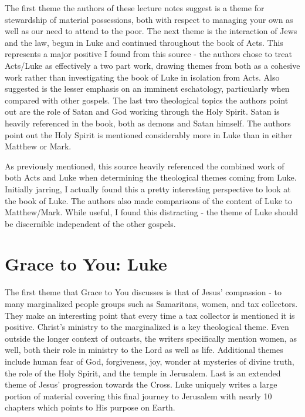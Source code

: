 \documentclass[12pt]{turabian-researchpaper}
\begin{document}
The first theme the authors of these lecture notes suggest is a theme for stewardship of material possessions, both with respect to managing your own as well as our need to attend to the poor. The next theme is the interaction of Jews and the law, begun in Luke and continued throughout the book of Acts. This represents a major positive I found from this source - the authors chose to treat Acts/Luke as effectively a two part work, drawing themes from both as a cohesive work rather than investigating the book of Luke in isolation from Acts. Also suggested is the lesser emphasis on an imminent eschatology, particularly when compared with other gospels. The last two theological topics the authors point out are the role of Satan and God working through the Holy Spirit. Satan is heavily referenced in the book, both as demons and Satan himself. The authors point out the Holy Spirit is mentioned considerably more in Luke than in either Matthew or Mark.

As previously mentioned, this source heavily referenced the combined work of both Acts and Luke when determining the theological themes coming from Luke. Initially jarring, I actually found this a pretty interesting perspective to look at the book of Luke. The authors also made comparisons of the content of Luke to Matthew/Mark. While useful, I found this distracting - the theme of Luke should be discernible independent of the other gospels.

\section{Grace to You: Luke\autocite{gty18}}

The first theme that Grace to You discusses is that of Jesus' compassion - to many marginalized people groups such as Samaritans, women, and tax collectors. They make an interesting point that every time a tax collector is mentioned it is positive.  Christ's ministry to the marginalized is a key theological theme. Even outside the longer context of outcasts, the writers specifically mention women, as well, both their role in ministry to the Lord as well as life. Additional themes include human fear of God, forgiveness, joy, wonder at mysteries of divine truth, the role of the Holy Spirit, and the temple in Jerusalem.  Last is an extended theme of Jesus' progression towards the Cross. Luke uniquely writes a large portion of material covering this final journey to Jerusalem with nearly 10 chapters which points to His purpose on Earth.
\end{document}
